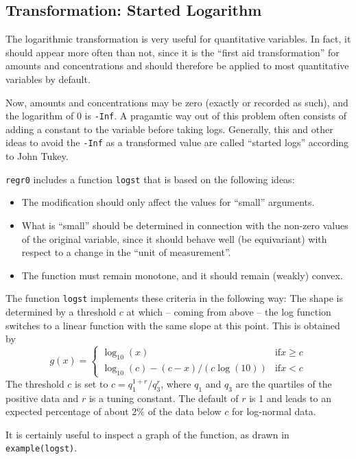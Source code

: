 \documentclass{article}
\begin{document}
\subsection{Transformation: Started Logarithm}
The logarithmic transformation is very useful for quantitative variables. 
In fact, it should appear more often than not, since it is the
``first aid transformation'' for amounts and concentrations and should
therefore be applied to most quantitative variables by default.

Now, amounts and concentrations may be zero (exactly or recorded as such),
and the logarithm of 0 is \texttt{-Inf}. 
A pragamtic way out of this problem often consists of adding a constant
to the variable before taking logs. 
Generally, this and other ideas to avoid the \texttt{-Inf} as a transformed
value are called ``started logs'' according to John Tukey.

\texttt{regr0} includes a function \texttt{logst} that is based on the
following ideas:
\begin{itemize}
\item 
The modification should only affect the values for ``small'' arguments.
\item
What is ``small'' should be determined in connection with the non-zero 
values of the original variable, since it should behave well (be
equivariant) with respect to a change in the ``unit of measurement''.
\item
The function must remain monotone, and it should remain (weakly) convex.
\end{itemize}

The function \texttt{logst} implements these criteria in the following way: 
The shape is determined by a threshold $c$ at which -- coming from above --
the log function switches to a linear function with the same slope at this
point. This is obtained by
$$
  g(x) = \left\{\begin{array}{ll}\log_{10}(x) & \mbox{if} x\ge c\\
         \log_{10}(c) - (c-x)/(c\log(10)) & \mbox{if} x< c
         \end{array}\right.
$$
The threshold $c$ is set to
$ c = q_1^{1+r}/q_3^r$, where $q_1$ and $q_3$ are the quartiles of the 
positive data and $r$ is a tuning constant. 
The default of $r$ is 1 and leads to an expected
percentage of about 2\% of the data below $c$ for log-normal data.

It is certainly useful to inspect a graph of the function, as drawn in 
\texttt{example(logst)}.
\end{document}
